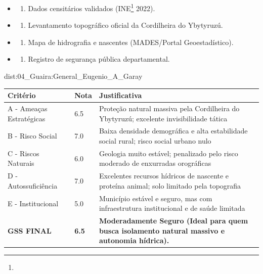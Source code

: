 {\begin{itemize}
\tightlist
\item
  \begin{enumerate}
  \def\labelenumi{\arabic{enumi})}
  \tightlist
  \item
    Dados censitários validados (INE\footnote{\fineINE} 2022).
  \end{enumerate}
\item
  \begin{enumerate}
  \def\labelenumi{\arabic{enumi})}
  \setcounter{enumi}{1}
  \tightlist
  \item
    Levantamento topográfico oficial da Cordilheira do Ybytyruzú.
  \end{enumerate}
\item
  \begin{enumerate}
  \def\labelenumi{\arabic{enumi})}
  \setcounter{enumi}{2}
  \tightlist
  \item
    Mapa de hidrografia e nascentes (MADES/\allowbreak Portal Geoestadístico).
  \end{enumerate}
\item
  \begin{enumerate}
  \def\labelenumi{\arabic{enumi})}
  \setcounter{enumi}{3}
  \tightlist
  \item
    Registro de segurança pública departamental.
  \end{enumerate}
\end{itemize}}{dist:04_Guaira:General_Eugenio_A_Garay}
\begin{table}[ht!]
\small \begin{tabular}{p{3.0cm}p{0.8cm}p{6.0cm}} \toprule
\textbf{Critério} & \textbf{Nota} & \textbf{Justificativa} \\ \midrule
A - Ameaças Estratégicas & 6.5 & Proteção natural massiva pela Cordilheira do Ybytyruzú; excelente invisibilidade tática \\
B - Risco Social & 7.0 & Baixa densidade demográfica e alta estabilidade social rural; risco social urbano nulo \\
C - Riscos Naturais & 6.0 & Geologia muito estável; penalizado pelo risco moderado de enxurradas orográficas \\
D - Autossuficiência & 7.0 & Excelentes recursos hídricos de nascente e proteína animal; solo limitado pela topografia \\
E - Institucional & 5.0 & Município estável e seguro, mas com infraestrutura institucional e de saúde limitada \\
\midrule \textbf{GSS FINAL} & \textbf{6.5} & \textbf{Moderadamente Seguro (Ideal para quem busca isolamento natural massivo e autonomia hídrica).} \\ \bottomrule \end{tabular}
\end{table}
